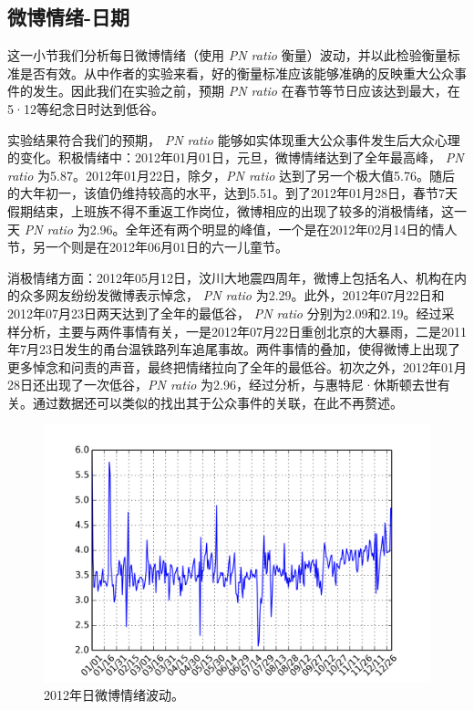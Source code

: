 \documentclass[12pt, oneside]{article}
\begin{document}
\begin{spacing}{1.5}
\begin{CJK}{UTF8}{gbsn}
\subsection{微博情绪-日期}
这一小节我们分析每日微博情绪（使用 {\it PN ratio} 衡量）波动，并以此检验衡量标准是否有效。从\cite{bollen2011twitter}中作者的实验来看，好的衡量标准应该能够准确的反映重大公众事件的发生。因此我们在实验之前，预期 {\it PN ratio} 在春节等节日应该达到最大，在5·12等纪念日时达到低谷。

实验结果符合我们的预期， {\it PN ratio} 能够如实体现重大公众事件发生后大众心理的变化。积极情绪中：2012年01月01日，元旦，微博情绪达到了全年最高峰， {\it PN ratio} 为5.87。2012年01月22日，除夕，{\it PN ratio} 达到了另一个极大值5.76。随后的大年初一，该值仍维持较高的水平，达到5.51。到了2012年01月28日，春节7天假期结束，上班族不得不重返工作岗位，微博相应的出现了较多的消极情绪，这一天 {\it PN ratio} 为2.96。全年还有两个明显的峰值，一个是在2012年02月14日的情人节，另一个则是在2012年06月01日的六一儿童节。

消极情绪方面：2012年05月12日，汶川大地震四周年，微博上包括名人、机构在内的众多网友纷纷发微博表示悼念， {\it PN ratio} 为2.29。此外，2012年07月22日和2012年07月23日两天达到了全年的最低谷， {\it PN ratio} 分别为2.09和2.19。经过采样分析，主要与两件事情有关，一是2012年07月22日重创北京的大暴雨，二是2011年7月23日发生的甬台温铁路列车追尾事故。两件事情的叠加，使得微博上出现了更多悼念和问责的声音，最终把情绪拉向了全年的最低谷。初次之外，2012年01月28日还出现了一次低谷，{\it PN ratio} 为2.96，经过分析，与惠特尼·休斯顿去世有关。通过数据还可以类似的找出其于公众事件的关联，在此不再赘述。

\begin{figure}
	\centering
	\includegraphics[width=0.8\linewidth]{../result/charts/emotion_day}
	\caption{2012年日微博情绪波动。}
	\label{fig:emotion_day}
\end{figure}


\end{CJK}
\end{spacing}
\end{document}
